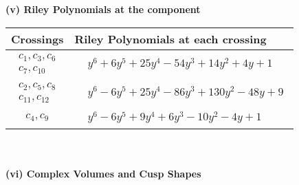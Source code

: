 \documentclass[1p]{elsarticle_modified}
\theoremstyle{definition}
\begin{document}
\newpage\renewcommand{\arraystretch}{1}
\flushleft \textbf{(v) Riley Polynomials at the component}\newline \\
\begin{tabular}{m{50pt}|m{274pt}}
Crossings & \hspace{64pt}Riley Polynomials at each crossing \\
\hline $$\begin{aligned}c_{1},c_{3},c_{6}\\c_{7},c_{10}\end{aligned}$$&$\begin{aligned}
&y^6+6 y^5+25 y^4-54 y^3+14 y^2+4 y+1
\end{aligned}$\\
\hline $$\begin{aligned}c_{2},c_{5},c_{8}\\c_{11},c_{12}\end{aligned}$$&$\begin{aligned}
&y^6-6 y^5+25 y^4-86 y^3+130 y^2-48 y+9
\end{aligned}$\\
\hline $$\begin{aligned}c_{4},c_{9}\end{aligned}$$&$\begin{aligned}
&y^6-6 y^5+9 y^4+6 y^3-10 y^2-4 y+1
\end{aligned}$\\
\hline
\end{tabular}\\~\\
\newpage\flushleft \textbf{(vi) Complex Volumes and Cusp Shapes}
\end{document}
